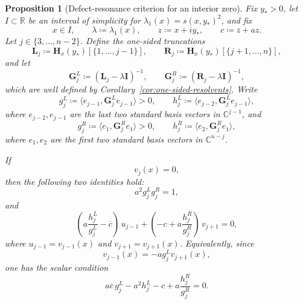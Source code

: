 \documentclass[11pt]{article}
\newtheorem{proposition}[theorem]{Proposition}
\begin{document}
\begin{proposition}[Defect-resonance criterion for an interior zero]\label{prop:defect-resonance}
Fix \(y_*>0\), let \(I\subset\mathbb R\) be an interval of simplicity for \(\lambda_1(x)=s(x,y_*)^2\), and fix
\[
x\in I,\qquad \lambda\coloneqq \lambda_1(x),\qquad z\coloneqq x+iy_*,
\qquad c\coloneqq \overline z + a z.
\]
Let \(j\in\{3,\dots,n-2\}\). Define the one-sided truncations
\[
\mathbf L_j\coloneqq \mathbf H_x(y_*)[\{1,\dots,j-1\}],
\qquad
\mathbf R_j\coloneqq \mathbf H_x(y_*)[\{j+1,\dots,n\}],
\]
and let
\[
\mathbf G_j^{L}\coloneqq (\mathbf L_j-\lambda \mathbf I)^{-1},
\qquad
\mathbf G_j^{R}\coloneqq (\mathbf R_j-\lambda \mathbf I)^{-1},
\]
which are well defined by Corollary~\ref{cor:one-sided-resolvents}. Write
\[
g_j^{L}\coloneqq \langle e_{j-1},\mathbf G_j^{L} e_{j-1}\rangle>0,
\qquad
h_j^{L}\coloneqq \langle e_{j-2},\mathbf G_j^{L} e_{j-1}\rangle,
\]
where \(e_{j-2},e_{j-1}\) are the last two standard basis vectors in \(\mathbb C^{j-1}\), and
\[
g_j^{R}\coloneqq \langle e_{1},\mathbf G_j^{R} e_{1}\rangle>0,
\qquad
h_j^{R}\coloneqq \langle e_{2},\mathbf G_j^{R} e_{1}\rangle,
\]
where \(e_{1},e_{2}\) are the first two standard basis vectors in \(\mathbb C^{n-j}\).

If
\[
v_j(x)=0,
\]
then the following two identities hold:
\[
\boxed{a^2 g_j^{L} g_j^{R}=1,}
\]
and
\[
\boxed{
\left(a\frac{h_j^{L}}{g_j^{L}}-\overline c\right)\,u_{j-1}
+
\left(-c+a\frac{h_j^{R}}{g_j^{R}}\right)\,v_{j+1}
=0,
}
\]
where \(u_{j-1}=v_{j-1}(x)\) and \(v_{j+1}=v_{j+1}(x)\). Equivalently, since
\[
v_{j-1}(x)=-a g_j^{L} v_{j+1}(x),
\]
one has the scalar condition
\[
\boxed{
a\overline c\,g_j^{L}-a^2 h_j^{L}-c+a\frac{h_j^{R}}{g_j^{R}}=0.
}
\]
\end{proposition}
\end{document}
